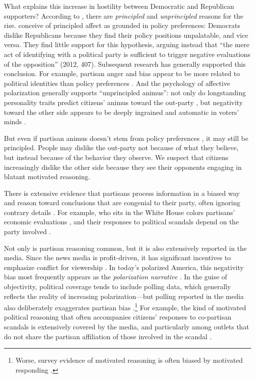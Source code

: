 \documentclass[12pt, letterpaper]{article}
\begin{document}
What explains this increase in hostility between Democratic and Republican supporters? According to \citet{IyengarSoodLelkes2012}, there are \emph{principled} and \emph{unprincipled} reasons for the rise. \citeauthor{IyengarSoodLelkes2012} conceive of principled affect as grounded in policy preferences: Democrats dislike Republicans because they find their policy positions unpalatable, and vice versa. They find little support for this hypothesis, arguing instead that ``the mere act of identifying with a political party is sufficient to trigger negative evaluations of the opposition'' (2012, 407). Subsequent research has generally supported this conclusion. For example, partisan anger and bias appear to be more related to political identities than policy preferences \citep{mason_2015}. And the psychology of affective polarization generally supports ``unprincipled animus'': not only do longstanding personality traits predict citizens' animus toward the out-party \citep{webster2018personal}, but negativity toward the other side appears to be deeply ingrained and automatic in voters' minds \citep{IyengarWestwood2014}.

But even if partisan animus doesn't stem from policy preferences \citep[e.g.,][]{rogowski2016how}, it may still be principled. People may dislike the out-party not because of what they believe, but instead because of the behavior they observe. We suspect that citizens increasingly dislike the other side because they see their opponents engaging in blatant motivated reasoning. 
 
There is extensive evidence that partisans process information in a biased way and reason toward conclusions that are congenial to their party, often ignoring contrary details \citep{lodgetaber_2013}. For example, who sits in the White House colors partisans' economic evaluations \citep{bartels_2002,bisgaard2015bias}, and their responses to political scandals depend on the party involved \citep{ahlersood_2014}. 

Not only is partisan reasoning common, but it is also extensively reported in the media. Since the news media is profit-driven, it has significant incentives to emphasize conflict for viewership \citep{soroka2015news}. In today's polarized America,  this negativity bias most frequently appears as the \emph{polarization narrative} \citep{levendusky2016does, searles2016}. In the guise of objectivity, political coverage tends to include polling data, which generally reflects the reality of increasing polarization---but polling reported in the media also deliberately exaggerates partisan bias \citep{luskin2018misinformation}.\footnote{Worse, survey evidence of motivated reasoning is often biased by motivated responding \citep{prior2015you}.} For example, the kind of motivated political reasoning that often accompanies citizens' responses to co-partisan scandals is extensively covered by the media, and particularly among outlets that do not share the partisan affiliation of those involved in the scandal \citep{budaketal_2016,puglisisnyder_2011}. 
\end{document}
